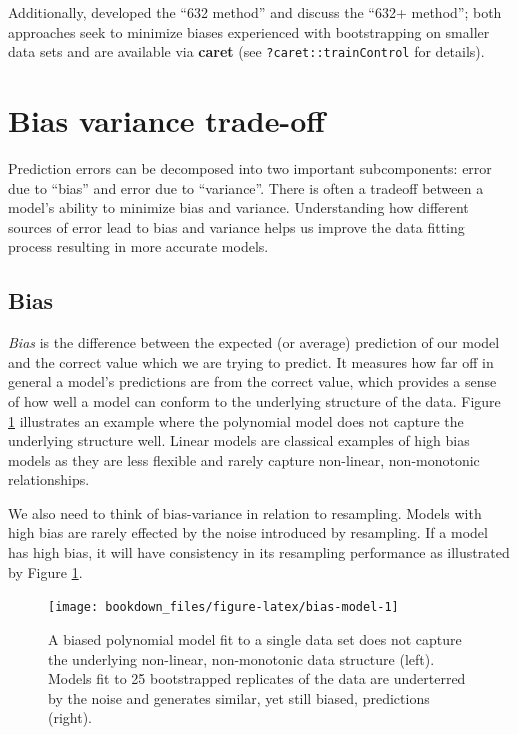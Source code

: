\documentclass[]{krantz}
\begin{document}
Additionally, \citet{efron1983estimating} developed the ``632 method'' and \citet{efron1997improvements} discuss the ``632+ method''; both approaches seek to minimize biases experienced with bootstrapping on smaller data sets and are available via \textbf{caret} (see \texttt{?caret::trainControl} for details).

\hypertarget{bias-var}{%
\section{Bias variance trade-off}\label{bias-var}}

Prediction errors can be decomposed into two important subcomponents: error due to ``bias'' and error due to ``variance''. There is often a tradeoff between a model's ability to minimize bias and variance. Understanding how different sources of error lead to bias and variance helps us improve the data fitting process resulting in more accurate models.

\hypertarget{bias}{%
\subsection{Bias}\label{bias}}

\emph{Bias} is the difference between the expected (or average) prediction of our model and the correct value which we are trying to predict. It measures how far off in general a model's predictions are from the correct value, which provides a sense of how well a model can conform to the underlying structure of the data. Figure \ref{fig:bias-model} illustrates an example where the polynomial model does not capture the underlying structure well. Linear models are classical examples of high bias models as they are less flexible and rarely capture non-linear, non-monotonic relationships.

We also need to think of bias-variance in relation to resampling. Models with high bias are rarely effected by the noise introduced by resampling. If a model has high bias, it will have consistency in its resampling performance as illustrated by Figure \ref{fig:bias-model}.

\begin{figure}

{\centering \texttt{[image: bookdown\_files/figure-latex/bias-model-1]} 

}

\caption{A biased polynomial model fit to a single data set does not capture the underlying non-linear, non-monotonic data structure (left).  Models fit to 25 bootstrapped replicates of the data are underterred by the noise and generates similar, yet still biased, predictions (right).}\label{fig:bias-model}
\end{figure}
\end{document}
